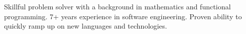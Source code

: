 

\begin{cvparagraph}

Skillful problem solver with a background in mathematics and
  functional programming.  7+ years experience in
  software engineering.  Proven ability to quickly ramp up on new
  languages and technologies.
\end{cvparagraph}
